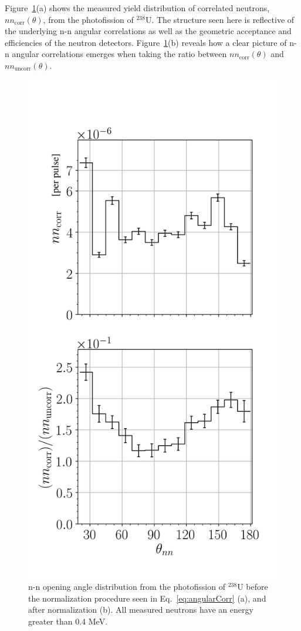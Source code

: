 Figure~\ref{fig:SPDPNormalization}(a) shows the measured yield distribution of correlated neutrons, $nn_{\text{corr}}(\theta)$, from the photofission of $^{238}$U.
The structure seen here is reflective of the underlying n-n angular correlations as well as the geometric acceptance and efficiencies of the neutron detectors.
Figure~\ref{fig:SPDPNormalization}(b) reveals how a clear picture of n-n angular correlations emerges when taking the ratio between $nn_{\text{corr}}(\theta)$ and $nn_{\text{uncorr}}(\theta)$.
\begin{figure}[]
\centering
    \includegraphics[width=\figsmall\textwidth]{SPDPNormalization.png}
    \caption{ n-n opening angle distribution from the photofission of $^{238}$U before the normalization procedure seen in Eq.~\ref{eq:angularCorr} (a), and after normalization (b).
    All measured neutrons have an energy greater than 0.4 MeV.}
    \label{fig:SPDPNormalization}
\end{figure}

